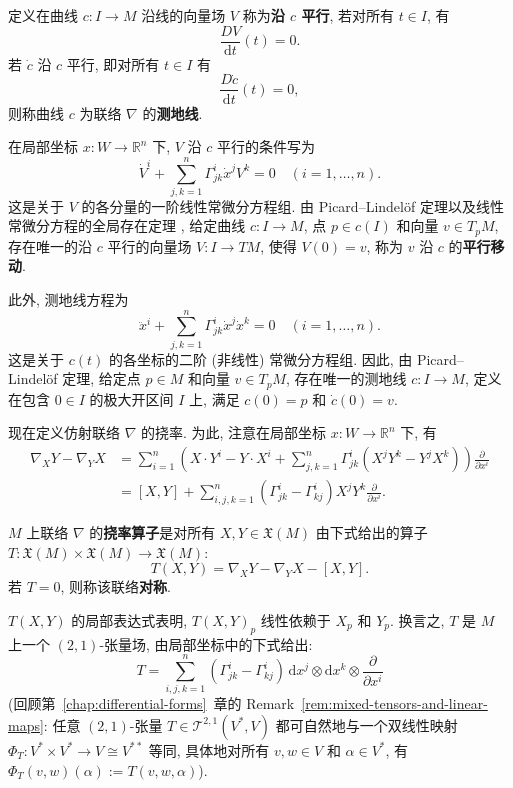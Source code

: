 \begin{RiemannDefinition}\label{def:parallel-vector-field-and-geodesic}
定义在曲线 $c:I\to M$ 沿线的向量场 $V$ 称为\textbf{沿 $c$ 平行}, 若对所有 $t\in I$, 有
\[
  \frac{DV}{\mathrm{d}t}(t)=0.
\]
若 $\dot c$ 沿 $c$ 平行, 即对所有 $t\in I$ 有
\[
  \frac{D\dot c}{\mathrm{d}t}(t)=0,
\]
则称曲线 $c$ 为联络 $\nabla$ 的\textbf{测地线}.
\end{RiemannDefinition}

在局部坐标 $x:W\to\mathbb{R}^n$ 下, $V$ 沿 $c$ 平行的条件写为
\begin{equation}\label{eq:parallel-transport-in-local-coordinates}
  \dot V^i+\sum_{j,k=1}^n\Gamma_{jk}^i\dot x^jV^k=0\quad(i=1,\ldots,n).
\end{equation}
这是关于 $V$ 的各分量的一阶线性常微分方程组. 由 Picard–Lindelöf 定理以及线性常微分方程的全局存在定理 , 给定曲线 $c:I\to M$, 点 $p\in c(I)$ 和向量 $v\in T_pM$, 存在唯一的沿 $c$ 平行的向量场 $V:I\to TM$, 使得 $V(0)=v$, 称为 $v$ 沿 $c$ 的\textbf{平行移动}.

此外, 测地线方程为
\begin{equation}\label{eq:geodesic-equations-in-local-coordinates}
  \ddot x^i+\sum_{j,k=1}^n\Gamma_{jk}^i\dot x^j\dot x^k=0\quad(i=1,\ldots,n).
\end{equation}
这是关于 $c(t)$ 的各坐标的二阶 (非线性) 常微分方程组. 因此, 由 Picard–Lindelöf 定理, 给定点 $p\in M$ 和向量 $v\in T_pM$, 存在唯一的测地线 $c:I\to M$, 定义在包含 $0\in I$ 的极大开区间 $I$ 上, 满足 $c(0)=p$ 和 $\dot c(0)=v$.

现在定义仿射联络 $\nabla$ 的挠率. 为此, 注意在局部坐标 $x:W\to\mathbb{R}^n$ 下, 有
\begin{align*}
  \nabla_XY-\nabla_YX
  &=\sum_{i=1}^n\left(X\cdot Y^i-Y\cdot X^i
    +\sum_{j,k=1}^n\Gamma_{jk}^i(X^jY^k-Y^jX^k)\right)\frac{\partial}{\partial x^i}\\
  &=[X,Y]+\sum_{i,j,k=1}^n(\Gamma_{jk}^i-\Gamma_{kj}^i)X^jY^k\frac{\partial}{\partial x^i}.
\end{align*}

\begin{RiemannDefinition}\label{def:torsion-of-affine-connection}
$M$ 上联络 $\nabla$ 的\textbf{挠率算子}是对所有 $X,Y\in\mathfrak{X}(M)$ 由下式给出的算子 $T:\mathfrak{X}(M)\times\mathfrak{X}(M)\to\mathfrak{X}(M)$:
\[
  T(X,Y)=\nabla_XY-\nabla_YX-[X,Y].
\]
若 $T=0$, 则称该联络\textbf{对称}.
\end{RiemannDefinition}

$T(X,Y)$ 的局部表达式表明, $T(X,Y)_p$ 线性依赖于 $X_p$ 和 $Y_p$. 换言之, $T$ 是 $M$ 上一个 $(2,1)$-张量场, 由局部坐标中的下式给出:
\[
  T=\sum_{i,j,k=1}^n(\Gamma_{jk}^i-\Gamma_{kj}^i)
    \,\mathrm{d}x^j\otimes\mathrm{d}x^k\otimes\frac{\partial}{\partial x^i}
\]
(回顾第~\ref{chap:differential-forms}~章的 Remark~\ref{rem:mixed-tensors-and-linear-maps}: 任意 $(2,1)$-张量 $T\in\mathcal{T}^{2,1}(V^*,V)$ 都可自然地与一个双线性映射 $\Phi_T:V^*\times V^*\to V\cong V^{**}$ 等同, 具体地对所有 $v,w\in V$ 和 $\alpha\in V^*$, 有 $\Phi_T(v,w)(\alpha):=T(v,w,\alpha)$).

